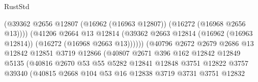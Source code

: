 \begin{lexlean}{RustStd}
\begin{coremodule}
                                            (@39362
                                              @2656
                                              @12807
                                              (@16962 (@16963 @12807))
                                              (@16272 (@16968 @2656 @13))))
                                          (@41206
                                            @2664
                                            @13
                                            @12814
                                            (@39362
                                              @2663
                                              @12814
                                              (@16962 (@16963 @12814))
                                              (@16272 (@16968 @2663 @13))))))
                                      (@40796
                                        @2672
                                        @2679
                                        @2686
                                        @13
                                        @12842
                                        @12851
                                        @3719
                                        @12866
                                        (@40807
                                          @2671
                                          @396
                                          @162
                                          @12842
                                          @12849
                                          @5135
                                          (@40816
                                            @2670
                                            @53
                                            @55
                                            @5282
                                            @12841
                                            @12848
                                            @3751
                                            @12822
                                            @3757
                                            @39340
                                            (@40815
                                              @2668
                                              @104
                                              @53
                                              @16
                                              @12838
                                              @3719
                                              @3731
                                              @3751
                                              @12832

\end{coremodule}
\end{lexlean}
